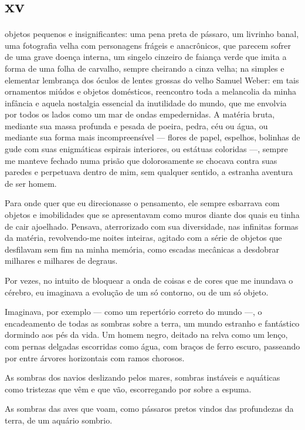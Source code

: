 \section{xv} 

 objetos pequenos e insignificantes: uma pena preta de pássaro, um
 livrinho banal, uma fotografia velha com personagens frágeis e anacrônicos,
 que parecem sofrer de uma grave doença interna, um singelo cinzeiro de
 faiança verde que imita a forma de uma folha de carvalho, sempre cheirando a
 cinza velha; na simples e elementar lembrança dos óculos de lentes grossas
 do velho Samuel Weber: em tais ornamentos miúdos e objetos domésticos,
 reencontro toda a melancolia da minha infância e aquela nostalgia essencial
 da inutilidade do mundo, que me envolvia por todos os lados como um mar de
 ondas empedernidas. A matéria bruta, mediante sua massa profunda e pesada de
 poeira, pedra, céu ou água, ou mediante sua forma mais incompreensível ---
 flores de papel, espelhos, bolinhas de gude com suas enigmáticas espirais
 interiores, ou estátuas coloridas ---, sempre me manteve fechado numa prisão
 que dolorosamente se chocava contra suas paredes e perpetuava dentro de mim,
 sem qualquer sentido, a estranha aventura de ser homem.

Para onde quer que eu direcionasse o pensamento, ele sempre esbarrava com
objetos e imobilidades que se apresentavam como muros diante dos quais eu
tinha de cair ajoelhado. Pensava, aterrorizado com sua diversidade, nas
infinitas formas da matéria, revolvendo-me noites inteiras, agitado com a
série de objetos que desfilavam sem fim na minha memória, como escadas
mecânicas a desdobrar milhares e milhares de degraus.

Por vezes, no intuito de bloquear a onda de coisas e de cores que me inundava
o cérebro, eu imaginava a evolução de um só contorno, ou de um só objeto.

Imaginava, por exemplo --- como um repertório correto do mundo ---, o
encadeamento de todas as sombras sobre a terra, um mundo estranho e
fantástico dormindo aos pés da vida. Um homem negro, deitado na relva como um
lenço, com pernas delgadas escorridas como água, com braços de ferro escuro,
passeando por entre árvores horizontais com ramos chorosos.

As sombras dos navios deslizando pelos mares, sombras instáveis e aquáticas
como tristezas que vêm e que vão, escorregando por sobre a espuma.

As sombras das aves que voam, como pássaros pretos vindos das profundezas da
terra, de um aquário sombrio.


